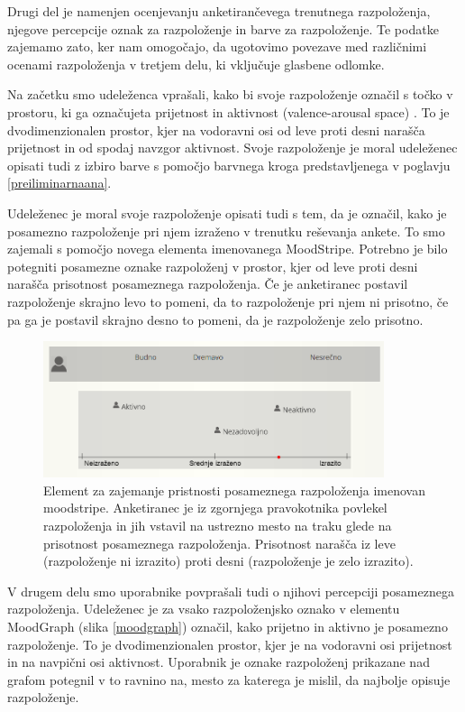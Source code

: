 \documentclass[a4paper, 12pt]{book}
\begin{document}
{Drugi del je namenjen ocenjevanju anketirančevega trenutnega razpoloženja, njegove percepcije oznak za razpoloženje in barve za razpoloženje. Te podatke zajemamo zato, ker nam omogočajo, da ugotovimo povezave med različnimi ocenami razpoloženja v tretjem delu, ki vključuje glasbene odlomke.

Na začetku smo udeleženca vprašali, kako bi svoje razpoloženje označil s točko v prostoru, ki ga označujeta prijetnost in aktivnost (valence-arousal space) \cite{Colibazzi2010}. To je dvodimenzionalen prostor, kjer na vodoravni osi od leve proti desni narašča prijetnost in od spodaj navzgor aktivnost. Svoje razpoloženje je moral udeleženec opisati tudi z izbiro barve s pomočjo barvnega kroga predstavljenega v poglavju \ref{preiliminarnaana}. 

Udeleženec je moral svoje razpoloženje opisati tudi s tem, da je označil, kako je posamezno razpoloženje pri njem izraženo v trenutku reševanja ankete. To smo zajemali s pomočjo novega elementa imenovanega MoodStripe. Potrebno je bilo potegniti posamezne oznake razpoloženj v prostor, kjer od leve proti desni narašča prisotnost posameznega razpoloženja. Če je anketiranec postavil razpoloženje skrajno levo to pomeni, da to razpoloženje pri njem ni prisotno, če pa ga je postavil skrajno desno to pomeni, da je razpoloženje zelo prisotno.

\begin{figure}[ht]
\centering
\includegraphics[width=10cm]{images/moodstripe.png}

\caption{Element za zajemanje pristnosti posameznega razpoloženja imenovan moodstripe. Anketiranec je iz zgornjega pravokotnika povlekel razpoloženja in jih vstavil na ustrezno mesto na traku glede na prisotnost posameznega razpoloženja. Prisotnost narašča iz leve (razpoloženje ni izrazito) proti desni (razpoloženje je zelo izrazito). }
\label{moodstripe}
\end{figure}

V drugem delu smo uporabnike povprašali tudi o njihovi percepciji posameznega razpoloženja. Udeleženec je za vsako razpoloženjsko oznako v elementu MoodGraph (slika \ref{moodgraph}) označil, kako prijetno in aktivno je posamezno razpoloženje. To je dvodimenzionalen prostor, kjer je na vodoravni osi prijetnost in na navpični osi aktivnost. Uporabnik je oznake razpoloženj prikazane nad grafom potegnil v to ravnino na, mesto za katerega je mislil, da najbolje opisuje razpoloženje. 

}
\end{document}
